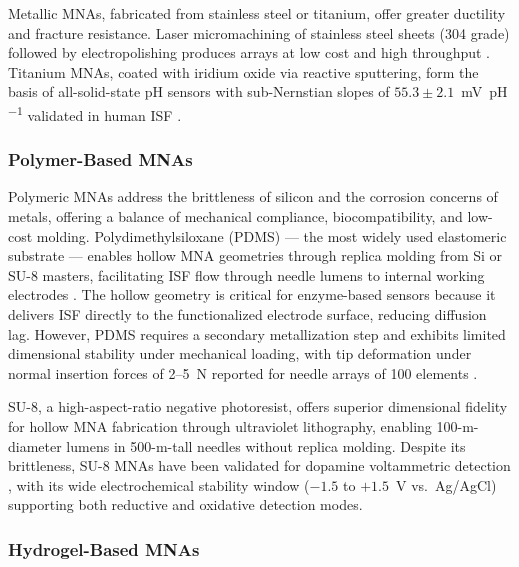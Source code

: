 \documentclass[review,1p]{elsarticle}
\begin{document}
Metallic MNAs, fabricated from stainless steel or titanium, offer greater ductility and fracture resistance. Laser micromachining of stainless steel sheets (304 grade) followed by electropolishing produces arrays at low cost and high throughput \cite{Calio2021}. Titanium MNAs, coated with iridium oxide via reactive sputtering, form the basis of all-solid-state pH sensors with sub-Nernstian slopes of $55.3 \pm 2.1$~mV~pH\textsuperscript{$-1$} validated in human ISF \cite{Fogh-Andersen2022, GarciaGuzman2021}.

\subsubsection{Polymer-Based MNAs}

Polymeric MNAs address the brittleness of silicon and the corrosion concerns of metals, offering a balance of mechanical compliance, biocompatibility, and low-cost molding. Polydimethylsiloxane (PDMS) — the most widely used elastomeric substrate — enables hollow MNA geometries through replica molding from Si or SU-8 masters, facilitating ISF flow through needle lumens to internal working electrodes \cite{Parrilla2022}. The hollow geometry is critical for enzyme-based sensors because it delivers ISF directly to the functionalized electrode surface, reducing diffusion lag. However, PDMS requires a secondary metallization step and exhibits limited dimensional stability under mechanical loading, with tip deformation under normal insertion forces of 2--5~N reported for needle arrays of 100 elements \cite{Yan2023Fracture}.

SU-8, a high-aspect-ratio negative photoresist, offers superior dimensional fidelity for hollow MNA fabrication through ultraviolet lithography, enabling 100-\textmu{}m-diameter lumens in 500-\textmu{}m-tall needles without replica molding. Despite its brittleness, SU-8 MNAs have been validated for dopamine voltammetric detection \cite{Rawson2021}, with its wide electrochemical stability window ($-1.5$ to $+1.5$~V vs.~Ag/AgCl) supporting both reductive and oxidative detection modes.

\subsubsection{Hydrogel-Based MNAs}
\end{document}
